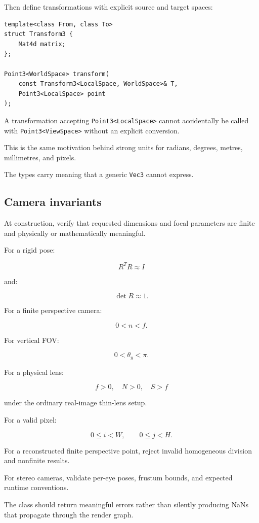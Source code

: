 Then define transformations with explicit source and target spaces:

\begin{verbatim}
template<class From, class To>
struct Transform3 {
    Mat4d matrix;
};

Point3<WorldSpace> transform(
    const Transform3<LocalSpace, WorldSpace>& T,
    Point3<LocalSpace> point
);
\end{verbatim}

A transformation accepting \texttt{Point3\textless{}LocalSpace\textgreater{}} cannot accidentally be called with \texttt{Point3\textless{}ViewSpace\textgreater{}} without an explicit conversion.

This is the same motivation behind strong units for radians, degrees, metres, millimetres, and pixels.

The types carry meaning that a generic \texttt{Vec3} cannot express.

\subsection{Camera invariants}\label{02-foundations-ii-ch037-camera-invariants}

At construction, verify that requested dimensions and focal parameters are finite and physically or mathematically meaningful.

For a rigid pose:

\[ R^TR\approx I \]

and:

\[ \det R\approx1. \]

For a finite perspective camera:

\[ 0<n<f. \]

For vertical FOV:

\[ 0<\theta_y<\pi. \]

For a physical lens:

\[ f>0,\quad N>0,\quad S>f \]

under the ordinary real-image thin-lens setup.

For a valid pixel:

\[ 0\le i<W,\qquad0\le j<H. \]

For a reconstructed finite perspective point, reject invalid homogeneous division and nonfinite results.

For stereo cameras, validate per-eye poses, frustum bounds, and expected runtime conventions.

The class should return meaningful errors rather than silently producing NaNs that propagate through the render graph.

